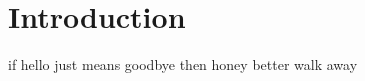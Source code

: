 \chapter*{Introduction}\label{cha:intro} %

if hello just means goodbye then honey better walk away
